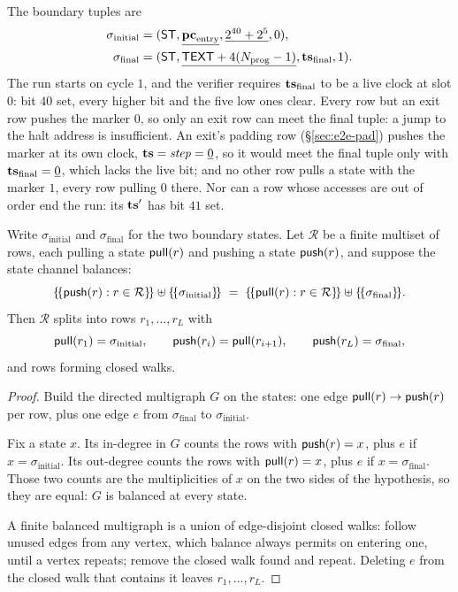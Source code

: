 The boundary tuples are
\begin{align*}
  \sigma_{\mathrm{initial}} &= ( \mathsf{ST},\underline{\mathbf{pc}_{\mathrm{entry}}},\underline{2^{40}+2^{5}},0 ),\\
  \sigma_{\mathrm{final}} &= ( \mathsf{ST},\underline{\mathsf{TEXT}+4(N_{\mathrm{prog}}-1)},\mathbf{ts}_{\mathrm{final}},1 ).
\end{align*}
The run starts on cycle $1$, and the verifier requires $\mathbf{ts}_{\mathrm{final}}$ to be a live clock at slot $0$: bit $40$ set, every higher bit and the five low ones clear. Every row but an exit row pushes the marker $0$, so only an exit row can meet the final tuple: a jump to the halt address is insufficient. An exit's padding row (\S\ref{sec:e2e-pad}) pushes the marker at its own clock, $\mathbf{ts}=\mathit{step}=\underline{0}$, so it would meet the final tuple only with $\mathbf{ts}_{\mathrm{final}}=\underline{0}$, which lacks the live bit; and no other row pulls a state with the marker $1$, every row pulling $0$ there. Nor can a row whose accesses are out of order end the run: its $\mathbf{ts}'$ has bit $41$ set.

\begin{proposition}\label{prop:walk}
Write $\sigma_{\mathrm{initial}}$ and $\sigma_{\mathrm{final}}$ for the two boundary states. Let $\mathcal R$ be a finite multiset of rows, each pulling a state $\mathsf{pull}(r)$ and pushing a state $\mathsf{push}(r)$, and suppose the state channel balances:
\[
  \mset{\bpush(r):r\in\mathcal R}\uplus\mset{\sigma_{\mathrm{initial}}}
  \;=\;\mset{\bpull(r):r\in\mathcal R}\uplus\mset{\sigma_{\mathrm{final}}} .
\]
Then $\mathcal R$ splits into rows $r_1,\dots,r_L$ with
\[
  \mathsf{pull}(r_1)=\sigma_{\mathrm{initial}},\qquad \mathsf{push}(r_i)=\mathsf{pull}(r_{i+1}),\qquad \mathsf{push}(r_L)=\sigma_{\mathrm{final}},
\]
and rows forming closed walks.
\end{proposition}

\begin{proof}
Build the directed multigraph $G$ on the states: one edge $\mathsf{pull}(r)\to \mathsf{push}(r)$ per row, plus one edge $e$ from $\sigma_{\mathrm{final}}$ to $\sigma_{\mathrm{initial}}$.

Fix a state $x$. Its in-degree in $G$ counts the rows with $\mathsf{push}(r)=x$, plus $e$ if $x=\sigma_{\mathrm{initial}}$. Its out-degree counts the rows with $\mathsf{pull}(r)=x$, plus $e$ if $x=\sigma_{\mathrm{final}}$. Those two counts are the multiplicities of $x$ on the two sides of the hypothesis, so they are equal: $G$ is balanced at every state.

A finite balanced multigraph is a union of edge-disjoint closed walks: follow unused edges from any vertex, which balance always permits on entering one, until a vertex repeats; remove the closed walk found and repeat. Deleting $e$ from the closed walk that contains it leaves $r_1,\dots,r_L$.
\end{proof}

